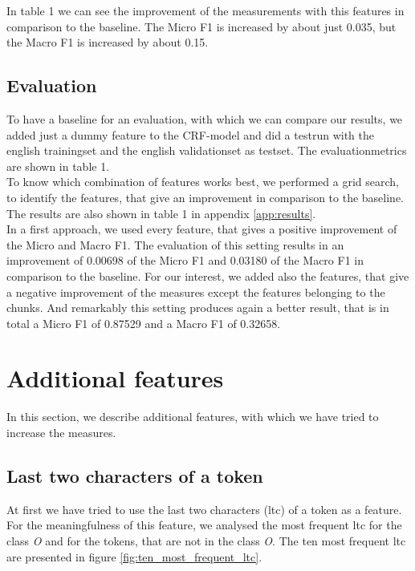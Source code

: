 \documentclass[noindent, nochapname]{tudexercise}
\begin{document}
		In table 1 we can see the improvement of the measurements with this features in comparison to the baseline. The Micro F1 is increased by about just 0.035, but the Macro F1 is increased by about 0.15.
		
		\subsection{Evaluation} \label{sec:evaluation}
			To have a baseline for an evaluation, with which we can compare our results, we added just a dummy feature to the CRF-model and did a testrun with the english trainingset and the english validationset as testset. The evaluationmetrics are shown in table 1.\\
			To know which combination of features works best, we performed a grid search, to identify the features, that give an improvement in comparison to the baseline. The results are also shown in table 1 in appendix \ref{app:results}.\\
			In a first approach, we used every feature, that gives a positive improvement of the Micro and Macro F1. The evaluation of this setting results in an improvement of 0.00698 of the Micro F1 and 0.03180 of the Macro F1 in comparison to the baseline. For our interest, we added also the features, that give a negative improvement of the measures except the features belonging to the chunks. And remarkably this setting produces again a better result, that is in total a Micro F1 of 0.87529 and a Macro F1 of 0.32658.
	
	\section{Additional features}
		In this section, we describe additional features, with which we have tried to increase the measures.
		
		\subsection{Last two characters of a token}
			At first we have tried to use the last two characters (ltc) of a token as a feature. For the meaningfulness of this feature, we analysed the most frequent ltc for the class \textit{O} and for the tokens, that are not in the class \textit{O}. The ten most frequent ltc are presented in figure \ref{fig:ten_most_frequent_ltc}.
			
\end{document}
